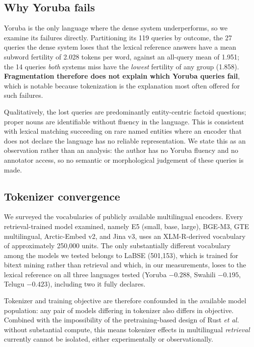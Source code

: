 \documentclass{ijimai_article}
\begin{document}
\subsection{Why Yoruba fails}
Yoruba is the only language where the dense system underperforms, so we examine its
failures directly. Partitioning its 119 queries by outcome, the 27 queries the dense
system loses that the lexical reference answers have a mean subword fertility of 2.028
tokens per word, against an all-query mean of 1.951; the 14 queries \emph{both} systems
miss have the \emph{lowest} fertility of any group (1.858). \textbf{Fragmentation
therefore does not explain which Yoruba queries fail}, which is notable because
tokenization is the explanation most often offered for such failures.

Qualitatively, the lost queries are predominantly entity-centric factoid questions;
proper nouns are identifiable without fluency in the language. This is consistent with
lexical matching succeeding on rare named entities where an encoder that does not
declare the language has no reliable representation. We state this as an observation
rather than an analysis: the author has no Yoruba fluency and no annotator access, so no
semantic or morphological judgement of these queries is made.

\subsection{Tokenizer convergence}
\label{sec:tokconverge}
We surveyed the vocabularies of publicly available multilingual encoders. Every
retrieval-trained model examined, namely E5 (small, base, large), BGE-M3, GTE
multilingual, Arctic-Embed v2, and Jina v3, uses an XLM-R-derived vocabulary of
approximately 250{,}000 units. The only substantially different vocabulary among
the models we tested belongs to LaBSE (501{,}153), which is trained for bitext
mining rather than retrieval and which, in our measurements, loses to the lexical
reference on all three languages tested (Yoruba $-0.288$, Swahili $-0.195$, Telugu
$-0.423$), including two it fully declares.

Tokenizer and training objective are therefore confounded in the available model
population: any pair of models differing in tokenizer also differs in objective.
Combined with the impossibility of the pretraining-based design of
Rust \emph{et al.}~\cite{rust2021} without substantial compute, this means
tokenizer effects in multilingual \emph{retrieval} currently cannot be isolated,
either experimentally or observationally.
\end{document}
